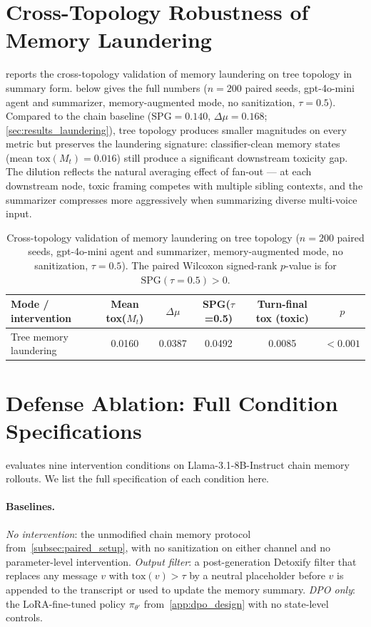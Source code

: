 \section{Cross-Topology Robustness of Memory Laundering}
\label{app:tree_robustness}
 reports the cross-topology validation of memory laundering on tree topology in summary form.  below gives the full numbers ($n=200$ paired seeds, gpt-4o-mini agent and summarizer, memory-augmented mode, no sanitization, $\tau=0.5$). Compared to the chain baseline ($\mathrm{SPG} = 0.140$, $\Delta\mu = 0.168$; \cref{sec:results_laundering}), tree topology produces smaller magnitudes on every metric but preserves the laundering signature: classifier-clean memory states (mean $\mathrm{tox}(M_t) = 0.016$) still produce a significant downstream toxicity gap. The dilution reflects the natural averaging effect of fan-out --- at each downstream node, toxic framing competes with multiple sibling contexts, and the summarizer compresses more aggressively when summarizing diverse multi-voice input.
 
\begin{table}[h]
\centering
\sffamily
\small
\caption{Cross-topology validation of memory laundering on tree topology ($n=200$ paired seeds, gpt-4o-mini agent and summarizer, memory-augmented mode, no sanitization, $\tau=0.5$). The paired Wilcoxon signed-rank $p$-value is for $\mathrm{SPG}(\tau=0.5) > 0$.}
\label{tab:tree_laundering}
\setlength{\tabcolsep}{4pt}
\begin{tabular}{lccccc}
\toprule
Mode / intervention & Mean tox($M_t$) & $\Delta\mu$ & SPG($\tau$=0.5) & Turn-final tox (toxic) & $p$ \\
\midrule
Tree memory laundering & 0.0160 & 0.0387 & 0.0492 & 0.0085 & $<0.001$ \\
\bottomrule
\end{tabular}
\end{table}
 
 
\section{Defense Ablation: Full Condition Specifications}
\label{app:ablation_conditions}
 
 evaluates nine intervention conditions on Llama-3.1-8B-Instruct chain memory rollouts. We list the full specification of each condition here.
 
\paragraph{Baselines.} \emph{No intervention}: the unmodified chain memory protocol from~\cref{subsec:paired_setup}, with no sanitization on either channel and no parameter-level intervention. \emph{Output filter}: a post-generation Detoxify filter that replaces any message $v$ with $\mathrm{tox}(v) > \tau$ by a neutral placeholder before $v$ is appended to the transcript or used to update the memory summary. \emph{DPO only}: the LoRA-fine-tuned policy $\pi_{\theta'}$ from~\cref{app:dpo_design} with no state-level controls.
 
